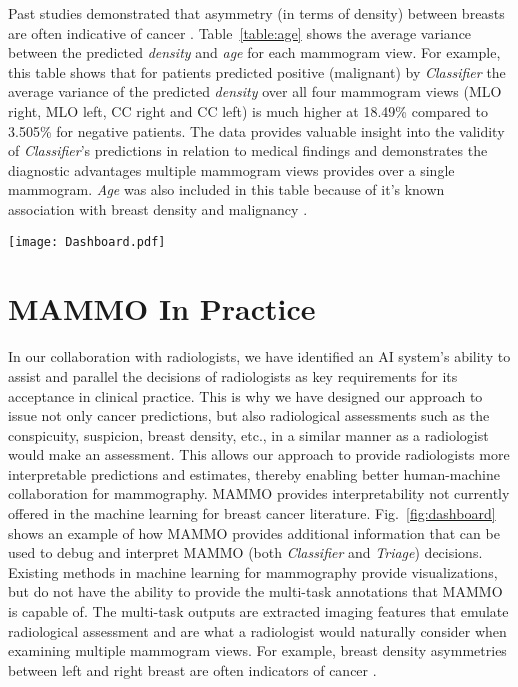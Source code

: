 \documentclass[journal]{IEEEtran}
\begin{document}
Past studies demonstrated that asymmetry (in terms of density) between breasts are often indicative of cancer \cite{breast-asymmetry1, breast-asymmetry2}. Table~\ref{table:age} shows the average variance between the predicted \textit{density} and \textit{age} for each mammogram view.  For example, this table shows that for patients predicted positive (malignant) by \textit{Classifier} the average variance of the predicted \textit{density} over all four mammogram views (MLO right, MLO left, CC right and CC  left) is much higher at  18.49\% compared to 3.505\% for negative patients. The data provides valuable insight into the validity of \textit{Classifier}'s predictions in relation to medical findings and demonstrates the diagnostic advantages multiple mammogram views provides over a single mammogram. \textit{Age} was also included in this table because of it's known association with breast density and malignancy \cite{age-breastdensity, age-breastdensity2}.  








\begin{figure*}[!t]
  \texttt{[image: Dashboard.pdf]}
  \caption{Example illustration of MAMMO interpretability by the radiologist in two ways: 1) visualization of MAMMO CNN identified features, and 2) multi-task outputs provide additional assessments for radiologist to scrutinize.}
  \label{fig:dashboard}
\end{figure*}

\section{MAMMO In Practice}

In our collaboration with radiologists, we have identified an AI system’s ability to assist and parallel the decisions of radiologists as key requirements for its acceptance in clinical practice.  This is why we have designed our approach to issue not only cancer predictions, but also radiological assessments such as the conspicuity, suspicion, breast density, etc., in a similar manner as a radiologist would make an assessment. This allows our approach to provide radiologists more interpretable predictions and estimates, thereby enabling better human-machine collaboration for mammography.  MAMMO provides interpretability not currently offered in the machine learning for breast cancer literature.  Fig.~\ref{fig:dashboard} shows an example of how MAMMO provides additional information that can be used to debug and interpret MAMMO (both \textit{Classifier} and \textit{Triage}) decisions.  Existing methods in machine learning for mammography provide visualizations, but do not have the ability to provide the multi-task annotations that MAMMO is capable of.  The multi-task outputs are extracted imaging features that emulate radiological assessment and are what a radiologist would naturally consider when examining multiple mammogram views.  For example, breast density asymmetries between left and right breast are often indicators of cancer \cite{breast-asymmetry1}.
\end{document}
